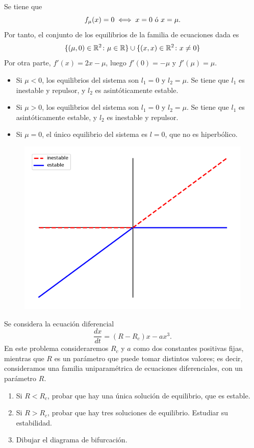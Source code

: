 \documentclass[11pt]{report}
\begin{document}
\begin{solution}
    Se tiene que
    \[f_\mu(x) = 0 \iff x = 0 \textup{ ó } x = \mu.\]
    Por tanto, el conjunto de los equilibrios de la familia de ecuaciones dada es
    \[\{(\mu,0)  \in\mathbb R^2\colon \mu \in \mathbb R\} \cup \{(x,x) \in\mathbb R^2\colon x \neq 0\}\]
    Por otra parte, $f'(x) = 2x-\mu$, luego $f'(0) = -\mu$ y $f'(\mu) = \mu$.
    \begin{itemize}
        \item Si $\mu < 0$, los equilibrios del sistema son $l_1 = 0$ y $l_2 = \mu$. Se tiene que $l_1$ es inestable y repulsor, y $l_2$ es asintóticamente estable.
        \item Si $\mu > 0$, los equilibrios del sistema son $l_1 = 0$ y $l_2 = \mu$. Se tiene que $l_1$ es asintóticamente estable, y $l_2$ es inestable y repulsor.
        \item Si $\mu = 0$, el único equilibrio del sistema es $l = 0$, que no es hiperbólico.
    \end{itemize}
    \begin{figure}[H]
        \centering
        \includegraphics[scale=0.5]{img/3.png}
    \end{figure}
\end{solution}

\begin{exercise}
    Se considera la ecuación diferencial
    \[\frac{dx}{dt} = (R-R_c)x-a x^3.\]
    En este problema consideraremos $R_c$ y $a$ como dos constantes positivas fijas, mientras que $R$ es un parámetro que puede tomar distintos valores; es decir, consideramos una familia uniparamétrica de ecuaciones diferenciales, con un parámetro $R$.
    \begin{enumerate}
        \item Si $R<R_c$, probar que hay una única solución de equilibrio, que es estable.
        \item Si $R>R_c$, probar que hay tres soluciones de equilibrio. Estudiar su estabilidad.
        \item Dibujar el diagrama de bifurcación.
    \end{enumerate}
\end{exercise}
\end{document}
